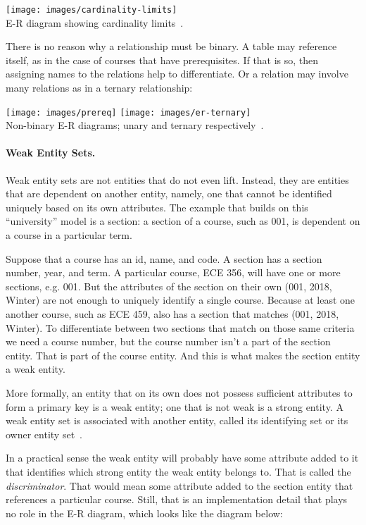 \documentclass[a4paper]{report}
\begin{document}
\begin{center}
\texttt{[image: images/cardinality-limits]}\\
E-R diagram showing cardinality limits~\cite{dsc}.
\end{center}

There is no reason why a relationship must be binary. A table may reference itself, as in the case of courses that have prerequisites. If that is so, then assigning names to the relations help to differentiate. Or a relation may involve many relations as in a ternary relationship:

\begin{center}
\texttt{[image: images/prereq]}
\texttt{[image: images/er-ternary]}\\
Non-binary E-R diagrams; unary and ternary respectively~\cite{dsc}.
\end{center}

\paragraph{Weak Entity Sets.} Weak entity sets are not entities that do not even lift. Instead, they are entities that are dependent on another entity, namely, one that cannot be identified uniquely based on its own attributes. The example that builds on this ``university'' model is a section: a section of a course, such as 001, is dependent on a course in a particular term. 

Suppose that a course has an id, name, and code. A section has a section number, year, and term. A particular course, ECE 356, will have one or more sections, e.g. 001. But the attributes of the section on their own (001, 2018, Winter) are not enough to uniquely identify a single course. Because at least one another course, such as ECE 459, also has a section that matches (001, 2018, Winter). To differentiate between two sections that match on those same criteria we need a course number, but the course number isn't a part of the section entity. That is part of the course entity. And this is what makes the section entity a weak entity.

More formally, an entity that on its own does not possess sufficient attributes to form a primary key is a weak entity; one that is not weak is a strong entity. A weak entity set is associated with another entity, called its identifying set or its owner entity set~\cite{dsc}.

In a practical sense the weak entity will probably have some attribute added to it that identifies which strong entity the weak entity belongs to. That is called the \textit{discriminator}. That would mean some attribute added to the section entity that references a particular course. Still, that is an implementation detail that plays no role in the E-R diagram, which looks like the diagram below:
\end{document}
